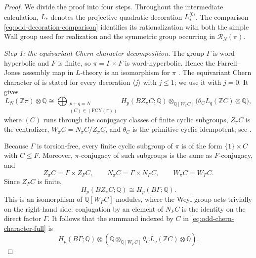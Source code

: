 \documentclass[10pt,reqno]{amsart}
\numberwithin{equation}{section}
\theoremstyle{definition}
\theoremstyle{remark}
\newcommand{\Z}{\mathbb Z}
\newcommand{\Q}{\mathbb Q}
\newcommand{\cR}{\mathcal R}
\begin{document}
\begin{proof}
We divide the proof into four steps.  Throughout the intermediate
calculation, \(L_*\) denotes the projective quadratic decoration
\(L_*^{\langle0\rangle}\).  The comparison
\eqref{eq:odd-decoration-comparison} identifies its rationalization
with both the simple Wall group used for realization and the symmetric
group occurring in \(\cR_N(\pi)\).

\smallskip
\noindent
\emph{Step 1: the equivariant Chern-character decomposition.}
The group \(\Gamma\) is word-hyperbolic and \(F\) is finite, so
\(\pi=\Gamma\times F\) is word-hyperbolic.  Hence the
Farrell--Jones assembly map in \(L\)-theory is an isomorphism for \(\pi\) \cite{BartelsLueck}.  The equivariant Chern character of
\cite[Theorem~178]{LueckReich} is stated for every decoration
\(\langle j\rangle\) with \(j\leq1\); we use it with \(j=0\).
It gives
\begin{equation}\label{eq:odd-chern-character-full}
L_N(\Z\pi)\otimes\Q
\cong
\bigoplus_{\substack{p+q=N\\(C)\in(\mathrm{FCY}(\pi))}}
H_p(BZ_\pi C;\Q)
\otimes_{\Q[W_\pi C]}
\bigl(\theta_C L_q(\Z C)\otimes\Q\bigr),
\end{equation}
where \((C)\) runs through the conjugacy classes of finite cyclic
subgroups, \(Z_\pi C\) is the centralizer,
\(W_\pi C=N_\pi C/Z_\pi C\), and \(\theta_C\) is the primitive
cyclic idempotent; see \cite[Theorem~178]{LueckReich}.

Because \(\Gamma\) is torsion-free, every finite cyclic subgroup of
\(\pi\) is of the form \(\{1\}\times C\) with \(C\leq F\).  Moreover,
\(\pi\)-conjugacy of such subgroups is the same as \(F\)-conjugacy,
and
\begin{equation}\label{eq:odd-centralizer-weyl}
Z_\pi C=\Gamma\times Z_FC,
\qquad
N_\pi C=\Gamma\times N_FC,
\qquad
W_\pi C=W_FC.
\end{equation}
Since \(Z_FC\) is finite,
\[
H_p(BZ_\pi C;\Q)
\cong H_p(B\Gamma;\Q).
\]
This is an isomorphism of \(\Q[W_FC]\)-modules, where the Weyl group
acts trivially on the right-hand side: conjugation by an element of
\(N_FC\) is the identity on the direct factor \(\Gamma\).  It follows
that the summand indexed by \(C\) in
\eqref{eq:odd-chern-character-full} is
\begin{equation}\label{eq:odd-separate-gamma-F}
H_p(B\Gamma;\Q)\otimes
\left(
 \Q\otimes_{\Q[W_FC]}
 \theta_C L_q(\Z C)\otimes\Q
\right).
\end{equation}


\end{proof}
\end{document}
